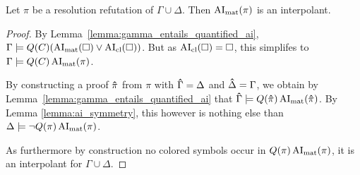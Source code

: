 \documentclass[,%
	draft=false,%
	numbers=noendperiod
	11pt,
	a4paper,
	oneside,%
	openany,
]{memoir}
\begin{document}
\begin{thm}
	Let $\pi$ be a resolution refutation of $\Gamma\cup\Delta$.
	Then $\operatorname{AI}_\mathrm{mat}( \pi )$ is an interpolant.
\end{thm}
\begin{proof}
	By Lemma~\ref{lemma:gamma_entails_quantified_ai},
	$\Gamma \models Q(C)(\operatorname{AI}_\mathrm{mat}(\square) \lor \operatorname{AI}_\mathrm{cl}(\square))$.
	But as $\operatorname{AI}_\mathrm{cl}(\square) = \square$, this simplifes to
	$\Gamma \models Q(C)\operatorname{AI}_\mathrm{mat}(\pi)$.

	By constructing a proof $\bm\hat \pi$ from $\pi$ with $\bm\hat \Gamma = \Delta$ and $\bm\hat \Delta = \Gamma$, we obtain by Lemma~\ref{lemma:gamma_entails_quantified_ai} that $\bm\hat\Gamma \models Q(\bm\hat \pi)\operatorname{AI}_\mathrm{mat}(\bm\hat \pi)$.
	By Lemma \ref{lemma:ai_symmetry}, this however is nothing else than
	$\Delta \models \lnot Q(\pi) \operatorname{AI}_\mathrm{mat}(\pi)$. 

	As furthermore by construction no colored symbols occur in $Q(\pi) \operatorname{AI}_\mathrm{mat}(\pi)$, it is an interpolant for $\Gamma\cup\Delta$.

\end{proof}
\end{document}
